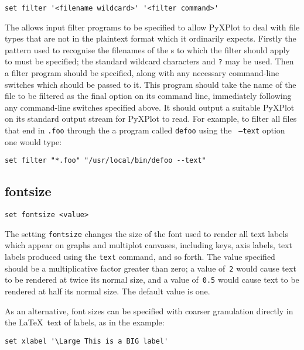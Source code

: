 \begin{verbatim}
set filter '<filename wildcard>' '<filter command>'
\end{verbatim}

The  allows input filter programs to be specified to allow
PyXPlot to deal with file types that are not in the plaintext format which it
ordinarily expects.  Firstly the pattern used to recognise the filenames of the
\datafile s to which the filter should apply to must be specified; the standard
wildcard characters {\tt *} and {\tt ?} may be used.  Then a filter program
should be specified, along with any necessary command-line switches which should
be passed to it.  This program should take the name of the file to be filtered
as the final option on its command line, immediately following any command-line
switches specified above.  It should output a suitable PyXPlot \datafile on its
standard output stream for PyXPlot to read.  For example, to filter all files
that end in {\tt .foo} through the a program called {\tt defoo} using the {\tt
--text} option one would type:

\begin{verbatim}
set filter "*.foo" "/usr/local/bin/defoo --text"
\end{verbatim}

\subsection{fontsize}

\begin{verbatim}
set fontsize <value>
\end{verbatim}

The setting {\tt fontsize} changes the size of the font used to render all text
labels which appear on graphs and multiplot canvases, including keys, axis
labels, text labels produced using the {\tt text} command, and so forth. The
value specified should be a multiplicative factor greater than zero; a value
of~{\tt 2} would cause text to be rendered at twice its normal size, and a
value of~{\tt 0.5} would cause text to be rendered at half its normal size.
The default value is one.

As an alternative, font sizes can be specified with coarser granulation
directly in the \LaTeX\ text of labels, as in the example:

\begin{verbatim}
set xlabel '\Large This is a BIG label'
\end{verbatim}


